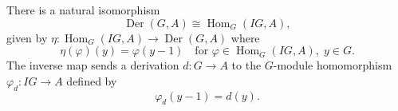 There is a natural isomorphism
$$\operatorname{Der}(G, A) \cong \operatorname{Hom}_G(IG, A),$$
given by $\eta : \operatorname{Hom}_G(IG, A) \to \operatorname{Der}(G, A)$ where
$$\eta(\varphi)(y) = \varphi(y - 1) \quad \text{for } \varphi \in \operatorname{Hom}_G(IG, A),\; y \in G.$$
The inverse map sends a derivation $d : G \to A$ to the $G$-module homomorphism $\varphi_d : IG \to A$ defined by
$$\varphi_d(y - 1) = d(y).$$
